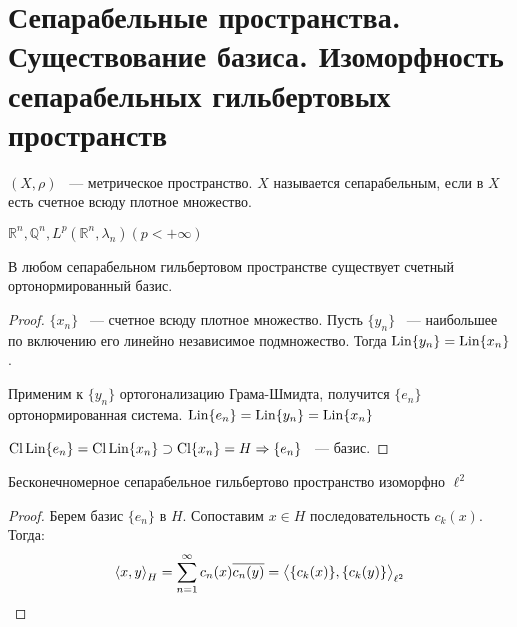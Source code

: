 \section{Сепарабельные пространства. Существование базиса. Изоморфность сепарабельных гильбертовых пространств}

\begin{definition} $(X, \rho)$ ~--- метрическое пространство. $X$ называется сепарабельным,
    если в $X$ есть счетное всюду плотное множество.
    \end{definition}
    
    \begin{examples} $\mathbb{R}^n, \mathbb{Q}^n, L^p(\mathbb{R}^n, \lambda_n) (p < +\infty)$
    \end{examples}
    
    \begin{theorem} В любом сепарабельном гильбертовом пространстве существует счетный
    ортонормированный базис.
    
    \end{theorem}
    
    \begin{proof}
    $\{x_n\}$ ~--- счетное всюду плотное множество. Пусть $\{y_n\}$ ~--- наибольшее по 
    включению его линейно независимое подмножество. Тогда $\operatorname{Lin}\{y_n\} = \operatorname{Lin}\{x_n\}$.
    
    Применим к $\{y_n\}$ ортогонализацию Грама-Шмидта, получится $\{e_n\}$ 
    ортонормированная система.  $\operatorname{Lin}\{e_n\} = \operatorname{Lin}\{y_n\} = \operatorname{Lin}\{x_n\}$
    
    $\operatorname{Cl} \operatorname{Lin}\{e_n\} = \operatorname{Cl} \operatorname{Lin}\{x_n\} \supset \operatorname{Cl} \{x_n\} = H \Rightarrow \{e_n\}$ ~--- базис.
    \end{proof}
    
    \begin{theorem} Бесконечномерное сепарабельное гильбертово пространство изоморфно 
    $\ell^2$
    
    \end{theorem}
    
    \begin{proof}
        Берем базис $\{e_n\}$ в $H$. Сопоставим $x \in H$ последовательность $c_k(x)$. Тогда: 
        \begin{gather*}
            \left\langle x, y \right\rangle_H = \sum\limits_{n=1}^\infty c_n(x)\overline{c_n(y)} = \left\langle \{c_k(x)\}, \{c_k(y)\} \right\rangle_{\ell^2}
        \end{gather*}
    \end{proof}

\newpage

